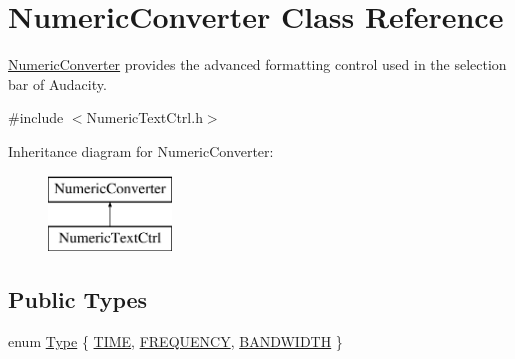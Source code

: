 \hypertarget{class_numeric_converter}{}\section{Numeric\+Converter Class Reference}
\label{class_numeric_converter}


\hyperlink{class_numeric_converter}{Numeric\+Converter} provides the advanced formatting control used in the selection bar of Audacity.  




{\ttfamily \#include $<$Numeric\+Text\+Ctrl.\+h$>$}

Inheritance diagram for Numeric\+Converter\+:\begin{figure}[H]
\begin{center}
\leavevmode
\includegraphics[height=2.000000cm]{class_numeric_converter}
\end{center}
\end{figure}
\subsection*{Public Types}
\begin{DoxyCompactItemize}
\item 
enum \hyperlink{class_numeric_converter_a2005a4bd0c2a9614868772e37fb9e2fb}{Type} \{ \hyperlink{class_numeric_converter_a2005a4bd0c2a9614868772e37fb9e2fba11037be864bfeacf9e0b8ecc1ae60d12}{T\+I\+ME}, 
\hyperlink{class_numeric_converter_a2005a4bd0c2a9614868772e37fb9e2fba0cb1c4c7c97e6c9390875fef8d7d7c91}{F\+R\+E\+Q\+U\+E\+N\+CY}, 
\hyperlink{class_numeric_converter_a2005a4bd0c2a9614868772e37fb9e2fba80e222a4ec594624193bdfd6ebe79819}{B\+A\+N\+D\+W\+I\+D\+TH}
 \}
\end{DoxyCompactItemize}

